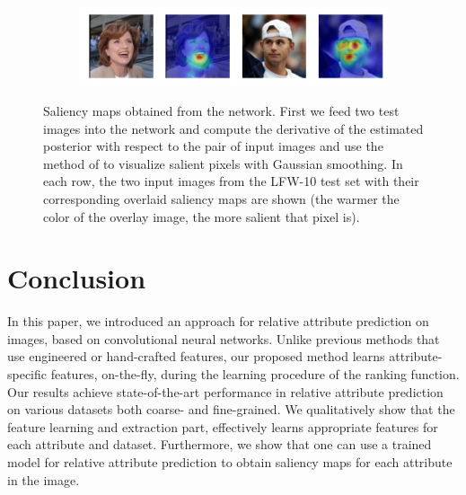 \documentclass[runningheads]{llncs}
\begin{document}
\begin{figure}
    \begin{subfigure}
        \centering
        \includegraphics[width=0.65\linewidth, trim={0 1cm 0 0},clip]{goodlooking-1.jpeg}
        \footnotesize
    \end{subfigure}
    
    \caption{Saliency maps obtained from the network. First we feed two test images into the network and compute the derivative of the estimated posterior with respect to the pair of input images and use the method of \cite{saliency} to visualize salient pixels with Gaussian smoothing. In each row, the two input images from the LFW-10 test set with their corresponding overlaid saliency maps are shown (the warmer the color of the overlay image, the more salient that pixel is).}
    \label{fig.5}
\end{figure}



\section{Conclusion}
\label{sec.5}

In this paper, we introduced an approach for relative attribute prediction on images, based on convolutional neural networks. Unlike previous methods that use engineered or hand-crafted features, our proposed method learns attribute-specific features, on-the-fly, during the learning procedure of the ranking function. Our results achieve state-of-the-art performance in relative attribute prediction on various datasets both coarse- and fine-grained.
We qualitatively show that the feature learning and extraction part, effectively learns appropriate features for each attribute and dataset.
Furthermore, we show that one can use a trained model for relative attribute prediction to obtain saliency maps for each attribute in the image.






\end{document}
